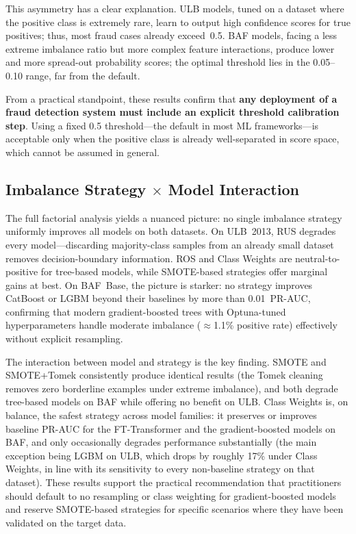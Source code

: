 This asymmetry has a clear explanation.
ULB models, tuned on a dataset where the positive class is extremely rare, learn to output high confidence scores for true positives; thus, most fraud cases already exceed~0.5.
BAF models, facing a less extreme imbalance ratio but more complex feature interactions, produce lower and more spread-out probability scores; the optimal threshold lies in the 0.05--0.10 range, far from the default.

From a practical standpoint, these results confirm that \textbf{any deployment of a fraud detection system must include an explicit threshold calibration step}.
Using a fixed 0.5 threshold---the default in most ML frameworks---is acceptable only when the positive class is already well-separated in score space, which cannot be assumed in general.

\subsection{Imbalance Strategy \texorpdfstring{$\times$}{x} Model Interaction}

The full factorial analysis yields a nuanced picture: no single imbalance strategy uniformly improves all models on both datasets.
On ULB~2013, RUS degrades every model---discarding majority-class samples from an already small dataset removes decision-boundary information.
ROS and Class Weights are neutral-to-positive for tree-based models, while SMOTE-based strategies offer marginal gains at best.
On BAF~Base, the picture is starker: no strategy improves CatBoost or LGBM beyond their baselines by more than 0.01~PR-AUC, confirming that modern gradient-boosted trees with Optuna-tuned hyperparameters handle moderate imbalance ($\approx$1.1\% positive rate) effectively without explicit resampling.

The interaction between model and strategy is the key finding.
SMOTE and SMOTE+Tomek consistently produce identical results (the Tomek cleaning removes zero borderline examples under extreme imbalance), and both degrade tree-based models on BAF while offering no benefit on ULB.
Class Weights is, on balance, the safest strategy across model families: it preserves or improves baseline PR-AUC for the FT-Transformer and the gradient-boosted models on BAF, and only occasionally degrades performance substantially (the main exception being LGBM on ULB, which drops by roughly 17\% under Class Weights, in line with its sensitivity to every non-baseline strategy on that dataset).
These results support the practical recommendation that practitioners should default to no resampling or class weighting for gradient-boosted models and reserve SMOTE-based strategies for specific scenarios where they have been validated on the target data.

